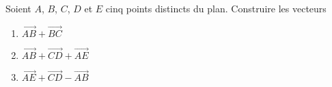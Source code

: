 
Soient $A$, $B$, $C$, $D$ et $E$ cinq points distincts du plan. Construire les vecteurs
\begin{enumerate}
\item $\overrightarrow{AB}+\overrightarrow{BC}$
\item $\overrightarrow{AB}+\overrightarrow{CD}+\overrightarrow{AE}$
\item $\overrightarrow{AE}+\overrightarrow{CD}-\overrightarrow{AB}$
\end{enumerate}